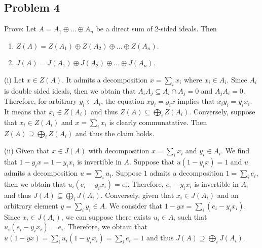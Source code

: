 \subsection*{Problem 4}
Prove: Let $A = A_1 \oplus \dots \oplus A_n$ be a direct sum of 2-sided ideals. Then
\begin{enumerate}
    \item[(i)] $Z(A) = Z(A_1) \oplus Z(A_2) \oplus \dots \oplus Z(A_n)$.
    \item[(ii)] $J(A) = J(A_1) \oplus J(A_2) \oplus \dots \oplus J(A_n)$.
\end{enumerate}
\begin{solution}
    (i) Let $x\in Z(A)$. It admits a decomposition $x = \sum_i x_i$ where $x_i\in A_i$.
    Since $A_i$ is double sided ideals, then we obtain that $A_iA_j\subseteq A_i\cap A_j = 0$ and $A_jA_i=0$. Therefore, 
    for arbitrary $y_i\in A_i$, the equation $xy_i=y_ix$ implies that $x_iy_i=y_ix_i$. It means that $x_i\in Z(A_i)$ and thus $Z(A)\subseteq \bigoplus_i Z(A_i)$.
    Conversely, suppose that $x_i\in Z(A_i)$ and $x=\sum_ix_i$ is clearly communatative. Then $Z(A)\supseteq \bigoplus_i Z(A_i)$ and thus the claim holds.

    (ii) Given that $x\in J(A)$ with decomposition $x=\sum_i x_i$ and $y_i\in A_i$. We find that $1-y_ix=1-y_ix_i$ is invertible in $A$. Suppose that $u(1-y_ix)=1$ and $u$ admits a decomposition $u=\sum_i u_i$.
    Suppose $1$ admits a decomposition $1=\sum_i e_i$, then we obtain that $u_i(e_i -y_ix_i)=e_i$. Therefore, $e_i-y_ix_i$ is invertible in $A_i$ and thus $J(A)\subseteq \bigoplus_i J(A_i)$.
    Conversely, given that $x_i\in J(A_i)$ and an arbitrary element $y=\sum_i y_i\in A$. We consider that $1-yx=\sum_i (e_i-y_ix_i)$. Since $x_i\in J(A_i)$, we can suppose there exists $u_i\in A_i$ such that $u_i(e_i-y_ix_i)=e_i$.
    Therefore, we obtain that $u(1-yx)=\sum_i u_i(1-y_ix_i)=\sum_i e_i = 1$ and thus $J(A)\supseteq \bigoplus_i J(A_i)$.
    
\end{solution}


